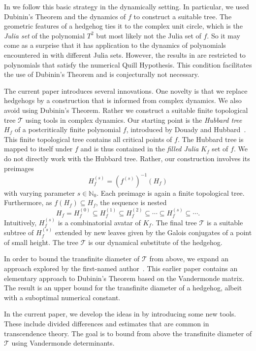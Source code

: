 \documentclass[12pt,oneside,a4]{amsart}
\newcommand{\IN}{\mathbb{N}}
\newcommand{\cT}{\mathcal{T}}
\numberwithin{maincounter}{section}
\numberwithin{equation}{section}
\renewcommand{\subset}{\subseteq}
\begin{document}
In \cite{hs:2021lower} we follow this basic strategy in the
dynamically setting. In particular, we used Dubinin's Theorem and the
dynamics of $f$ to construct a suitable tree. The geometric features
of a hedgehog ties it to the complex unit circle, which is the
\textit{Julia set} of the polynomial $T^2$ but most
likely not the Julia set of $f$. So it may
come as a surprise that it has application to the dynamics of
polynomials encountered in \cite{hs:2021lower} with different Julia
sets. However, the results in \cite{hs:2021lower} are restricted to
polynomials that satisfy the numerical Quill Hypothesis. This
condition facilitates the use of Dubinin's Theorem and is conjecturally
not necessary.

The current paper introduces several innovations. One novelty is that
we replace hedgehogs by a construction that is informed from complex
dynamics. We also avoid using Dubinin's Theorem. Rather we construct a
suitable finite topological tree $\cT$ using tools in complex
dynamics. Our starting point is the \textit{Hubbard tree} $H_f$ of a
postcritically finite polynomial $f$, introduced by Douady and
Hubbard~\cite{DH:etudedynI}. This finite topological tree contains all
critical points of $f$. The Hubbard tree is mapped to itself under $f$
and is thus contained in the \textit{filled Julia} $K_f$ set of $f$.
We do not directly work with the Hubbard tree. Rather, our
construction involves its preimages
 $$H_f^{(s)}= (f^{(s)})^{-1}(H_f)$$ with
varying parameter $s\in\IN_0$. Each preimage is again a finite topological
tree. Furthermore, as $f(H_f)\subset H_f$, the sequence is nested
\begin{equation}
  \label{eq:Hfsequence}
H_f =   H_f^{(0)} \subset  H_f^{(1)} \subset H_f^{(2)}\subset
\cdots\subset  H_f^{(s)}\subset \cdots.
\end{equation}
Intuitively,  $H_f^{(s)}$  is a combinatorial avatar of $K_f$.
The final tree $\cT$ is a suitable subtree of $H_f^{(s)}$  extended
by new leaves given by the Galois conjugates of a point of small height.
The tree $\cT$ is our dynamical substitute of the hedgehog.

In order to bound the transfinite diameter of $\cT$ from above, we
expand an approach explored by the first-named
author~\cite{hab:dubinin}. This earlier paper contains an elementary
approach to Dubinin's Theorem based on the Vandermonde matrix. The
result is an upper bound for the transfinite diameter of a hedgehog,
albeit with a suboptimal numerical constant.

In the current paper, we develop the ideas in \cite{hab:dubinin} by
introducing some new tools. These include divided differences and
estimates that are common in transcendence theory.
The goal is to bound from above the transfinite diameter of $\cT$ using
Vandermonde determinants.
\end{document}
